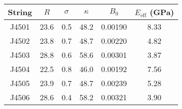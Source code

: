 \begin{tabular}{cccccc}
\toprule
String & $R$ & $\sigma$ & $\kappa$ & $B_0$ & $E_\mathrm{eff}$ (GPa) \\
\midrule
J4501 & 23.6 & 0.5 & 48.2 & 0.00190 & 8.33 \\
J4502 & 23.8 & 0.7 & 48.7 & 0.00220 & 4.82 \\
J4503 & 28.8 & 0.6 & 58.6 & 0.00301 & 3.87 \\
J4504 & 22.5 & 0.8 & 46.0 & 0.00192 & 7.56 \\
J4505 & 23.9 & 0.7 & 48.7 & 0.00239 & 5.28 \\
J4506 & 28.6 & 0.4 & 58.2 & 0.00321 & 3.90 \\
\bottomrule
\end{tabular}

